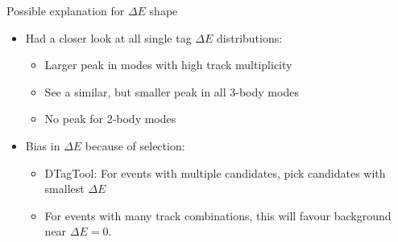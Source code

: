 \documentclass{beamer}
\begin{document}
\begin{frame}{Possible explanation for $\Delta E$ shape}
  \begin{itemize}
    \setlength\itemsep{2em}
    \item{Had a closer look at all single tag $\Delta E$ distributions:}
    \begin{itemize}
      \item{Larger peak in modes with high track multiplicity}
      \item{See a similar, but smaller peak in all 3-body modes}
      \item{No peak for 2-body modes}
    \end{itemize}
    \item{Bias in $\Delta E$ because of selection:}
    \begin{itemize}
      \item{DTagTool: For events with multiple candidates, pick candidates with smallest $\Delta E$}
      \item{For events with many track combinations, this will favour background near $\Delta E = 0$.}
    \end{itemize}
  \end{itemize}
\end{frame}
\end{document}
